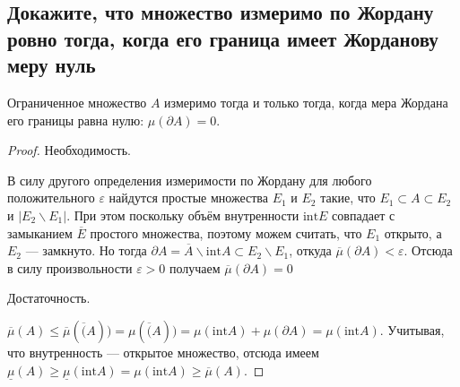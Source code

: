 
\subsection{Докажите, что множество измеримо по Жордану ровно тогда, когда его граница имеет Жорданову меру нуль}
\begin{theorem}
    Ограниченное множество $A$ измеримо тогда и только тогда, когда мера Жордана его границы равна нулю:
    $\mu(\partial A) = 0$.
\end{theorem}
\begin{proof}
    
    Необходимость.

    В силу другого определения измеримости по Жордану для любого положительного $\varepsilon$ найдутся простые
    множества $E_1$ и $E_2$ такие, что $E_1 \subset A \subset E_2$ и $|E_2 \backslash E_1|$. При этом поскольку объём
    внутренности $\text{int}E$ совпадает с замыканием $\overline{E}$ простого множества, поэтому можем считать, что
    $E_1$ открыто, а $E_2$ --- замкнуто. Но тогда $\partial A = \overline A \backslash \text{int}A \subset E_2 \backslash E_1$,
    откуда $\overline{\mu}(\partial A) < \varepsilon$. Отсюда в силу произвольности $\varepsilon > 0$ получаем
    $\overline{\mu}(\partial A) = 0$

    Достаточность.

    $\overline{\mu}(A) \leqslant \overline{\mu}(\overline(A)) = \mu(\overline(A)) = \mu(\text{int}A) + \mu(\partial A) =
    \mu(\text{int} A)$. Учитывая, что внутренность --- открытое множество, отсюда имеем $\underline{\mu}(A) \geqslant
    \underline{\mu}(\text{int} A) = \mu(\text{int} A) \geqslant \overline \mu(A)$.
\end{proof}


